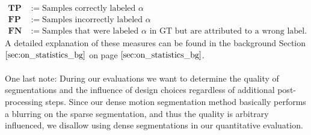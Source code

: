 \begin{equation}
\begin{aligned}
	\textbf{TP} &:= \text{Samples correctly labeled $\alpha$} \\
	\textbf{FP} &:= \text{Samples incorrectly labeled $\alpha$} \\
	\textbf{FN} &:= \text{Samples that were labeled $\alpha$ in GT but are attributed to a wrong label.}
\end{aligned}
\label{eq:statistical_counts}
\end{equation}
A detailed explanation of these measures can be found in the background Section $\ref{sec:on_statistics_bg}$ on page $\pageref{sec:on_statistics_bg}$. \\ \\
One last note: During our evaluations we want to determine the quality of segmentations and the influence of design choices regardless of additional post-processing steps. Since our dense motion segmentation method basically performs a blurring on the sparse segmentation, and thus the quality is arbitrary influenced, we disallow using dense segmentations in our quantitative evaluation.

